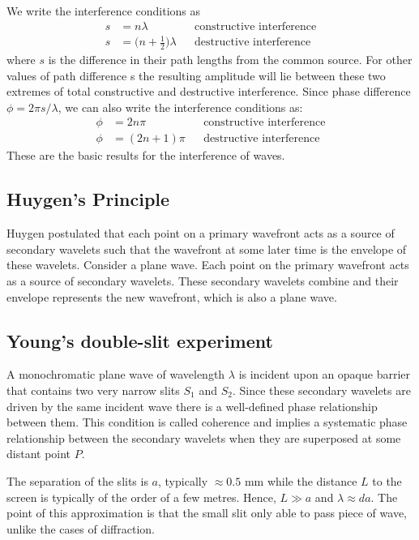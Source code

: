 \documentclass[../../../main.tex]{subfiles}
\begin{document}
We write the interference conditions as
\begin{align*}
    s &= n\lambda &&\text{constructive interference}\\
    s &= \biggl(n+\frac{1}{2}\biggr)\lambda&&\text{destructive interference}
\end{align*}
where $s$ is the difference in their path lengths from the common source. For other values of path difference s the resulting amplitude will lie between these two extremes of total constructive and destructive interference. Since phase difference $\phi=2\pi s/\lambda$, we can also write the interference conditions as:
\begin{align*}
    \phi &= 2n\pi &&\text{constructive interference}\\
    \phi &= (2n+1)\pi&&\text{destructive interference}
\end{align*}
These are the basic results for the interference of waves.

\subsection{Huygen's Principle}
Huygen postulated that each point on a primary wavefront acts as a source of secondary wavelets such that the wavefront at some later time is the envelope of these wavelets. Consider a plane wave. Each point on the primary wavefront acts as a source of secondary wavelets. These secondary wavelets combine and their envelope represents the new wavefront, which is also a plane wave.

\begin{figure}[h]
    \centering
\end{figure}


\subsection{Young's double-slit experiment}
A monochromatic plane wave of wavelength $\lambda$ is incident upon an opaque barrier that contains two very narrow slits $S_1$ and $S_2$. Since these secondary wavelets are driven by the same incident wave there is a well-defined phase relationship between them. This condition is called coherence and implies a systematic phase relationship between the secondary wavelets when they are superposed at some distant point $P$. 

The separation of the slits is $a$, typically $\approx0.5$ mm while the 
distance $L$ to the screen is typically of the order of a few metres. Hence, $L \gg a$ and $\lambda\approx da$. The point of this approximation is that the small slit only able to pass piece of wave, unlike the cases of diffraction.
\end{document}

